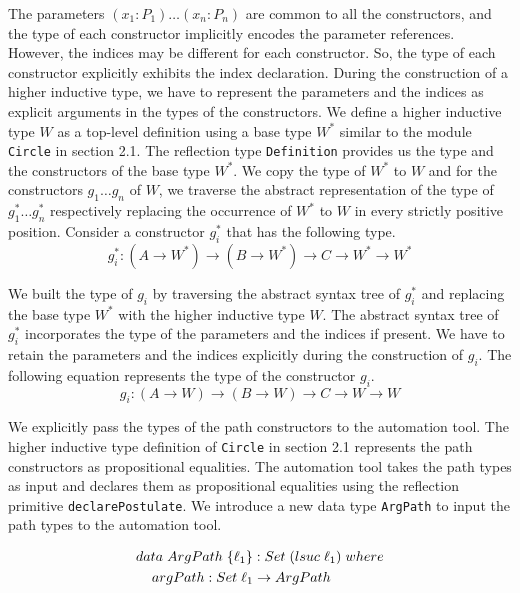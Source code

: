 \documentclass[sigplan,10pt]{acmart}
\begin{document}
The parameters $(x_1:P_1)\ldots(x_n:P_n)$ are common to all the constructors, and the type of each constructor implicitly encodes the parameter references. However, the indices may be different for each constructor. So, the type of each constructor explicitly exhibits  the index declaration. During the construction of a higher inductive type, we have to represent the parameters and the indices as explicit arguments in the types of the constructors. We define a higher inductive type $W$ as a top-level definition using a base type $W^*$ similar to the module {\tt Circle} in section 2.1. The reflection type {\tt Definition} provides us the type and the constructors of the base type $W^*$. We copy the type of $W^*$ to $W$ and for the constructors $g_1 \ldots g_n$ of $W$, we traverse the abstract representation of the type of $g_1^* \ldots g_n^*$ respectively replacing the occurrence of $W^*$ to $W$ in every strictly positive position. Consider a constructor $g_i^*$ that has the following type.
\begin{equation}
g_i^* : (A \rightarrow W^*) \rightarrow (B \rightarrow W^*) \rightarrow C \rightarrow W^* \rightarrow W^* \nonumber
\end{equation}

We built the type of $g_i$ by traversing the abstract syntax tree of $g_i^*$ and replacing the base type $W^*$ with the higher inductive type $W$. The abstract syntax tree of $g_i^*$ incorporates the type of the parameters and the indices if present. We have to retain the parameters and the indices explicitly during the construction of $g_i$. The following equation  represents the type of the constructor $g_i$.
\begin{equation}
g_i : (A \rightarrow W) \rightarrow (B \rightarrow W) \rightarrow C \rightarrow W \rightarrow W \nonumber
\end{equation}

We explicitly pass the types of the path constructors to the automation tool. The higher inductive type definition of {\tt Circle} in section 2.1 represents the path constructors as propositional equalities. The automation tool takes the path types as input and declares them as propositional equalities using the reflection primitive {\tt declarePostulate}. We introduce a new data type {\tt ArgPath} to input the path types to the automation tool.
\begin{center}
\begingroup
\fontsize{7.9pt}{0pt}\selectfont
\begin{align}
& data \hspace {0.1cm} ArgPath \hspace {0.1cm} \{\ell_1\} : Set \hspace {0.1cm} (lsuc \hspace {0.1cm} \ell_1) \hspace {0.1cm} where \nonumber \\
& \hspace {0.4cm} argPath : Set \hspace {0.1cm} \ell_1 \rightarrow ArgPath \nonumber \\ \nonumber
\end{align}
\endgroup
\end{center}
\normalsize
\end{document}
